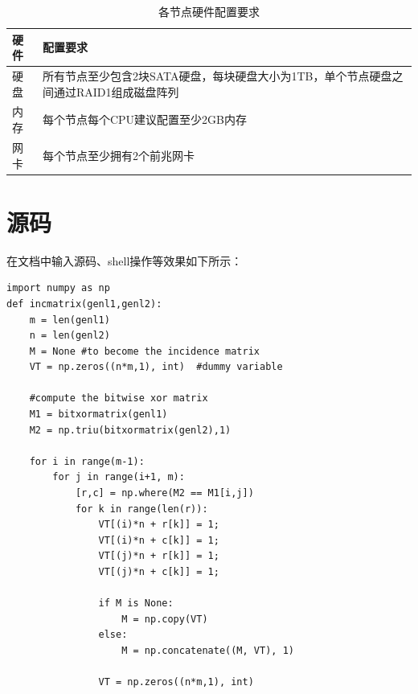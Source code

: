 \begin{table}[htb]
\centering
\label{tableExample}
\begin{tabular}{p{3cm}|p{9cm}}
\hline\hline

\textbf{硬件} & \textbf{配置要求} \\
\hline\hline

硬盘 & 所有节点至少包含2块SATA硬盘，每块硬盘大小为1TB，单个节点硬盘之间通过RAID1组成磁盘阵列 \\
\hline

内存 & 每个节点每个CPU建议配置至少2GB内存 \\
\hline

网卡 & 每个节点至少拥有2个前兆网卡 \\
\hline

\hline\hline
\end{tabular}
\caption{各节点硬件配置要求}
\end{table}


\section{源码}
在文档中输入源码、shell操作等效果如下所示：

\begin{Verbatim}[]
import numpy as np
def incmatrix(genl1,genl2):
    m = len(genl1)
    n = len(genl2)
    M = None #to become the incidence matrix
    VT = np.zeros((n*m,1), int)  #dummy variable
 
    #compute the bitwise xor matrix
    M1 = bitxormatrix(genl1)
    M2 = np.triu(bitxormatrix(genl2),1) 
 
    for i in range(m-1):
        for j in range(i+1, m):
            [r,c] = np.where(M2 == M1[i,j])
            for k in range(len(r)):
                VT[(i)*n + r[k]] = 1;
                VT[(i)*n + c[k]] = 1;
                VT[(j)*n + r[k]] = 1;
                VT[(j)*n + c[k]] = 1;
 
                if M is None:
                    M = np.copy(VT)
                else:
                    M = np.concatenate((M, VT), 1)
 
                VT = np.zeros((n*m,1), int)
 
\end{Verbatim}
